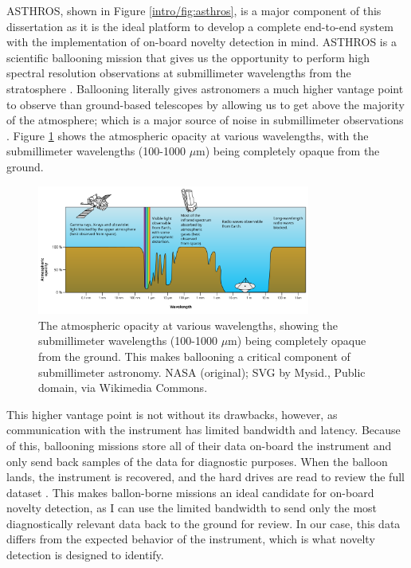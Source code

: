 ASTHROS, shown in Figure \ref{intro/fig:asthros}, is a major component of this dissertation as it is the ideal platform to develop a complete end-to-end system with the implementation of on-board novelty detection in mind. 
ASTHROS is a scientific ballooning mission that gives us the opportunity to perform high spectral resolution observations at submillimeter wavelengths from the stratosphere \parencite{siles2020asthros}.
Ballooning literally gives astronomers a much higher vantage point to observe than ground-based telescopes by allowing us to get above the majority of the atmosphere; which is a major source of noise in submillimeter observations \parencite{yajima2009scientific}.
Figure \ref{intro/fig:atmosphere} shows the atmospheric opacity at various wavelengths, with the submillimeter wavelengths (100-1000 $\mu$m) being completely opaque from the ground.

\begin{figure}
\centering
\includegraphics[width=0.8\textwidth]{figs/intro/atmosphere.png}
\caption[Atmospheric Opacity at Various Wavelengths]{
    The atmospheric opacity at various wavelengths, showing the submillimeter wavelengths (100-1000 $\mu$m) being completely opaque from the ground.
    This makes ballooning a critical component of submillimeter astronomy. NASA (original); SVG by Mysid., Public domain, via Wikimedia Commons.
    \label{intro/fig:atmosphere}
}
\end{figure}

This higher vantage point is not without its drawbacks, however, as communication with the instrument has limited bandwidth and latency. 
Because of this, ballooning missions store all of their data on-board the instrument and only send back samples of the data for diagnostic purposes.
When the balloon lands, the instrument is recovered, and the hard drives are read to review the full dataset \parencite{walker_STO}.
This makes ballon-borne missions an ideal candidate for on-board novelty detection, as I can use the limited bandwidth to send only the most diagnostically relevant data back to the ground for review.
In our case, this data differs from the expected behavior of the instrument, which is what novelty detection is designed to identify.

